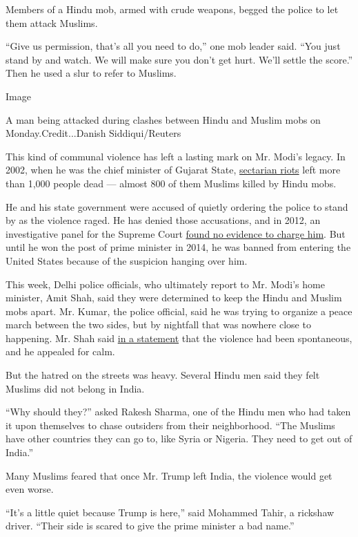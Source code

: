 Members of a Hindu mob, armed with crude weapons, begged the police to
let them attack Muslims.

``Give us permission, that's all you need to do,'' one mob leader said.
``You just stand by and watch. We will make sure you don't get hurt.
We'll settle the score.'' Then he used a slur to refer to Muslims.

Image

A man being attacked during clashes between Hindu and Muslim mobs on
Monday.Credit...Danish Siddiqui/Reuters

This kind of communal violence has left a lasting mark on Mr. Modi's
legacy. In 2002, when he was the chief minister of Gujarat State,
\href{https://www.nytimes.com/interactive/2014/04/06/world/asia/modi-gujarat-riots-timeline.html\#/\#time287_8514}{sectarian
riots} left more than 1,000 people dead --- almost 800 of them Muslims
killed by Hindu mobs.

He and his state government were accused of quietly ordering the police
to stand by as the violence raged. He has denied those accusations, and
in 2012, an investigative panel for the Supreme Court
\href{http://archive.indianexpress.com/news/SIT-report-clears-Modi--61-others/935226}{found
no evidence to charge him}. But until he won the post of prime minister
in 2014, he was banned from entering the United States because of the
suspicion hanging over him.

This week, Delhi police officials, who ultimately report to Mr. Modi's
home minister, Amit Shah, said they were determined to keep the Hindu
and Muslim mobs apart. Mr. Kumar, the police official, said he was
trying to organize a peace march between the two sides, but by nightfall
that was nowhere close to happening. Mr. Shah said
\href{https://pib.gov.in/PressReleaseIframePage.aspx?PRID=1604308\#.XlUMyhCxIX8.twitter}{in
a statement} that the violence had been spontaneous, and he appealed for
calm.

But the hatred on the streets was heavy. Several Hindu men said they
felt Muslims did not belong in India.

``Why should they?'' asked Rakesh Sharma, one of the Hindu men who had
taken it upon themselves to chase outsiders from their neighborhood.
``The Muslims have other countries they can go to, like Syria or
Nigeria. They need to get out of India.''

Many Muslims feared that once Mr. Trump left India, the violence would
get even worse.

``It's a little quiet because Trump is here,'' said Mohammed Tahir, a
rickshaw driver. ``Their side is scared to give the prime minister a bad
name.''

